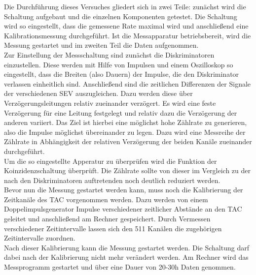 Die Durchführung dieses Versuches gliedert sich in zwei Teile: zunächst wird die Schaltung aufgebaut und die einzelnen Komponenten getestet. Die Schaltung wird so eingestellt, dass die gemessene Rate maximal wird und anschließend eine Kalibrationsmessung durchgeführt. Ist die Messapparatur betriebsbereit, wird die Messung gestartet und im zweiten Teil die Daten aufgenommen. \\
Zur Einstellung der Messschaltung sind zunächst die Diskriminatoren einzustellen. Diese werden mit Hilfe von Impulsen und einem Oszilloskop so eingestellt, dass die Breiten (also Dauern) der Impulse, die den Diskriminator verlassen einheitlich sind. Anschließend sind die zeitlichen Differenzen der Signale der verschiedenen SEV auszugleichen. Dazu werden diese über Verzögerungsleitungen relativ zueinander verzögert. Es wird eine feste Verzögerung für eine Leitung festgelegt und relativ dazu die Verzögerung der anderen variiert. Das Ziel ist hierbei eine möglichst hohe Zählrate zu generieren, also die Impulse möglichst übereinander zu legen. Dazu wird eine Messreihe der Zählrate in Abhängigkeit der relativen Verzögerung der beiden Kanäle zueinander durchgeführt. \\
Um die so eingestellte Apperatur zu überprüfen wird die Funktion der Koinzidenzschaltung überprüft. Die Zählrate sollte von dieser im Vergleich zu der nach den Diskriminatoren auftretenden noch deutlich reduziert werden. \\
Bevor nun die Messung gestartet werden kann, muss noch die Kalibrierung der Zeitkanäle des TAC vorgenommen werden. Dazu werden von einem Doppelimpulsgenerator Impulse verschiedener zeitlicher Abstände an den TAC geleitet und anschließend am Rechner gespeichert. Durch Vermessen verschiedener Zeitintervalle lassen sich den 511 Kanälen die zugehörigen Zeitintervalle zuordnen. \\
Nach dieser Kalibrierung kann die Messung gestartet werden. Die Schaltung darf dabei nach der Kalibrierung nicht mehr verändert werden. Am Rechner wird das Messprogramm gestartet und über eine Dauer von 20-30h Daten genommen.
